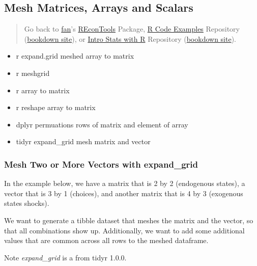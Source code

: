 \documentclass[
]{book}
\providecommand{\tightlist}{%
  \setlength{\itemsep}{0pt}\setlength{\parskip}{0pt}}
\begin{document}
\hypertarget{mesh-matrices-arrays-and-scalars}{%
\subsection{Mesh Matrices, Arrays and Scalars}\label{mesh-matrices-arrays-and-scalars}}

\begin{quote}
Go back to \href{http://fanwangecon.github.io/}{fan}'s \href{https://fanwangecon.github.io/REconTools/}{REconTools} Package, \href{https://fanwangecon.github.io/R4Econ/}{R Code Examples} Repository (\href{https://fanwangecon.github.io/R4Econ/bookdown}{bookdown site}), or \href{https://fanwangecon.github.io/Stat4Econ/}{Intro Stats with R} Repository (\href{https://fanwangecon.github.io/Stat4Econ/bookdown}{bookdown site}).
\end{quote}

\begin{itemize}
\tightlist
\item
  r expand.grid meshed array to matrix
\item
  r meshgrid
\item
  r array to matrix
\item
  r reshape array to matrix
\item
  dplyr permuations rows of matrix and element of array
\item
  tidyr expand\_grid mesh matrix and vector
\end{itemize}

\hypertarget{mesh-two-or-more-vectors-with-expand_grid}{%
\subsubsection{Mesh Two or More Vectors with expand\_grid}\label{mesh-two-or-more-vectors-with-expand_grid}}

In the example below, we have a matrix that is 2 by 2 (endogenous states), a vector that is 3 by 1 (choices), and another matrix that is 4 by 3 (exogenous states shocks).

We want to generate a tibble dataset that meshes the matrix and the vector, so that all combinations show up. Additionally, we want to add some additional values that are common across all rows to the meshed dataframe.

Note \emph{expand\_grid} is a from tidyr 1.0.0.
\end{document}

